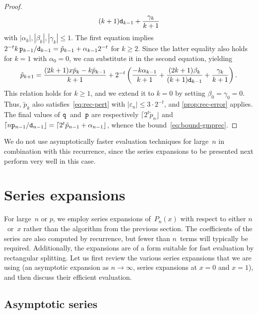 \documentclass[nohypdvips,review]{siamart0216}
\begin{document}
\begin{proof}
\begin{align*}
          { (k+1) \mathtt d_{k-1} }
     + \frac{\gamma_k}{k+1}
\end{align*}
with $|\alpha_k|, |\beta_k|, |\gamma_k| \leq 1$.
The first equation implies
$2^{-t} k \, \mathtt p_{k-1}/\mathtt d_{k-1} = \tilde p_{k-1} + \alpha_{k-1} 2^{-t}$
for $k \geq 2$.
Since the latter equality also holds for $k = 1$ with $\alpha_0 = 0$, we can
substitute it in the second equation, yielding
\[
  \tilde p_{k+1}
  = \frac{ (2k+1) x \tilde p_k - k \tilde p_{k-1} }{k+1}
     + 2^{-t} \left(
          \frac{-k \alpha_{k-1}}{k+1}
        + \frac{(2k + 1) \beta_k}{(k+1) \mathtt d_{k-1}}
        + \frac{\gamma_k}{k+1}
       \right).
\]
This relation holds for $k \geq 1$, and we extend it to $k=0$ by setting
$\beta_0 = \gamma_0 = 0$.
Thus, $\tilde p_k$ also satisfies~\cref{eq:rec-pert} with
$|\varepsilon_n| \leq 3 \cdot 2^{-t}$, and \cref{prop:rec-error} applies.
The final values of $\mathtt q$~and~$\mathtt p$ are respectively
$\lceil 2^t \tilde p_n \rfloor$
and
$\lceil n \mathtt p_{n-1}/\mathtt d_{n-1} \rfloor
= \lceil 2^t \tilde p_{n-1} + \alpha_{n-1} \rfloor$,
whence the bound~\cref{eq:bound-gmprec}.
\end{proof}

We do not use asymptotically faster evaluation techniques for large~$n$ in
combination with this recurrence, since the series expansions to be
presented next perform very well in this case.

\section{Series expansions}

\label{sec:series}

For large $n$ or $p$, we employ series expansions of $P_n(x)$ with
respect to either $n$ or $x$ rather than the algorithm from the
previous section.
The coefficients of the series are also computed by recurrence,
but fewer than $n$ terms will typically be required.
Additionally, the expansions are of a form suitable for fast
evaluation by rectangular splitting.
Let us first review the various series expansions that we are using
(an asymptotic expansion as $n \to \infty$, series expansions at $x=0$
and $x=1$), and then discuss their efficient evaluation.

\subsection{Asymptotic series}

\label{sec:series-asy}
\end{document}
